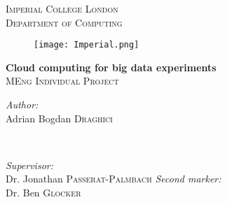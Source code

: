\newcommand{\HRule}{\rule{\linewidth}{0.5mm}} %
\clearpage
\thispagestyle{empty}

\begin{center} %
 

\vspace{5cm}
\textsc{\LARGE Imperial College London}\\[0.5cm] %
\textsc{\Large Department of Computing}\\[1.5cm] %

\begin{figure}[H]
	\centering
		\texttt{[image: Imperial.png]}
\end{figure}



\vspace{-0.5cm}
{ \vspace{0.3cm}\huge \bfseries Cloud computing for big data experiments } \\[0.4cm]
\textsc{\large MEng Individual Project}\\[1.5cm] %
 


\begin{minipage}{0.4\textwidth}
\begin{flushleft} \large
\emph{Author:}\\
Adrian Bogdan \textsc{Draghici} \\ \vspace{0.63cm}
\end{flushleft}
\end{minipage}
~
\begin{minipage}{0.5\textwidth}
\begin{flushright} \large
\emph{Supervisor:} \\
Dr. Jonathan \textsc{Passerat-Palmbach}
\emph{Second marker:} \\
Dr. Ben \textsc{Glocker} 
\end{flushright}


\end{minipage}
\end{center}

